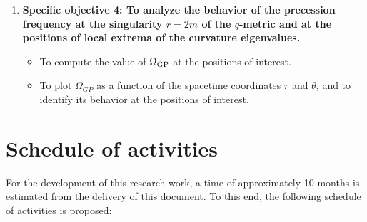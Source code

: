 \documentclass[12pt]{article}
\begin{document}
\begin{enumerate}
	\item {\bf Specific objective 4: To analyze the behavior of the precession frequency at the singularity $r=2m$ of the $q$-metric and at the positions of local extrema of the curvature eigenvalues.}
	\begin{itemize}
		\item[\A{9}] To compute the value of $\Omega_{\rm GP}$ at the positions of interest.
		\item[\A{10}] To plot $\Omega_{GP}$ as a function of the spacetime coordinates $r$ and $\theta$, and to identify its behavior at the positions of interest.
	\end{itemize} 	
\end{enumerate}

\section{Schedule of activities}
For the development of this research work, a time of approximately 10 months is estimated from the delivery of this document. To this end, the following schedule of activities is
proposed:
\end{document}
